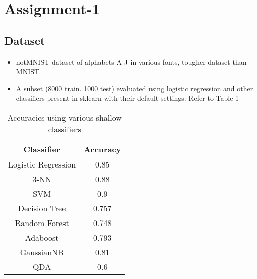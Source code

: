 \documentclass{article}
\begin{document}
\section{Assignment-1}
\subsection{Dataset}
\begin{itemize}
	\item notMNIST dataset of alphabets A-J in various fonts, tougher dataset than MNIST
	\item A subset (8000 train. 1000 test) evaluated using logistic regression and other classifiers present in sklearn with their default settings. Refer to Table 1
\end{itemize}

\begin{table}[]
\centering

\label{my-label}
\begin{tabular}{|c|c|}
\hline
 Classifier& Accuracy  \\ \hline
 Logistic Regression & 0.85 \\ \hline
 3-NN&  0.88\\ \hline
 SVM & 0.9 \\ \hline
 Decision Tree& 0.757 \\ \hline
 Random Forest&  0.748\\ \hline
Adaboost &  0.793\\ \hline
 GaussianNB&  0.81\\ \hline
 QDA&  0.6\\ \hline
\end{tabular}
\caption{Accuracies using various shallow classifiers}
\end{table}
\end{document}

